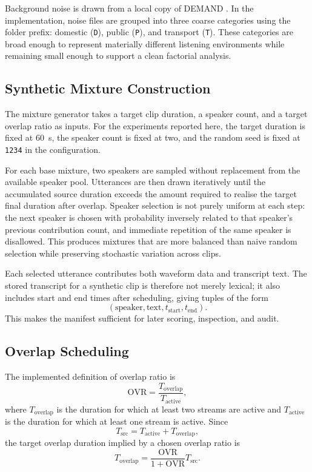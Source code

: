 Background noise is drawn from a local copy of DEMAND \citep{demand}. In the implementation, noise files are grouped into three coarse categories using the folder prefix: domestic (\texttt{D}), public (\texttt{P}), and transport (\texttt{T}). These categories are broad enough to represent materially different listening environments while remaining small enough to support a clean factorial analysis.

\subsection{Synthetic Mixture Construction}
The mixture generator takes a target clip duration, a speaker count, and a target overlap ratio as inputs. For the experiments reported here, the target duration is fixed at \SI{60}{\second}, the speaker count is fixed at two, and the random seed is fixed at \texttt{1234} in the configuration.

For each base mixture, two speakers are sampled without replacement from the available speaker pool. Utterances are then drawn iteratively until the accumulated source duration exceeds the amount required to realise the target final duration after overlap. Speaker selection is not purely uniform at each step: the next speaker is chosen with probability inversely related to that speaker's previous contribution count, and immediate repetition of the same speaker is disallowed. This produces mixtures that are more balanced than naive random selection while preserving stochastic variation across clips.

Each selected utterance contributes both waveform data and transcript text. The stored transcript for a synthetic clip is therefore not merely lexical; it also includes start and end times after scheduling, giving tuples of the form
\begin{equation}
(\text{speaker}, \text{text}, t_{\text{start}}, t_{\text{end}}).
\end{equation}
This makes the manifest sufficient for later scoring, inspection, and audit.

\subsection{Overlap Scheduling}
The implemented definition of overlap ratio is
\begin{equation}
\mathrm{OVR} = \frac{T_{\mathrm{overlap}}}{T_{\mathrm{active}}},
\end{equation}
where \(T_{\mathrm{overlap}}\) is the duration for which at least two streams are active and \(T_{\mathrm{active}}\) is the duration for which at least one stream is active. Since
\begin{equation}
T_{\mathrm{src}} = T_{\mathrm{active}} + T_{\mathrm{overlap}},
\end{equation}
the target overlap duration implied by a chosen overlap ratio is
\begin{equation}
T_{\mathrm{overlap}} = \frac{\mathrm{OVR}}{1+\mathrm{OVR}} T_{\mathrm{src}}.
\end{equation}

